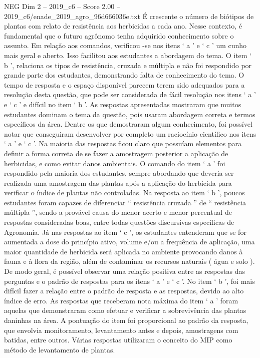 \begin{textsample}{NEG Dim 2 – 2019\_c6 – Score 2.00 – 2019\_c6/enade\_2019\_agro\_96d666036e.txt}
É crescente o número de biótipos de plantas com relato de resistência aos herbicidas a cada ano.
Nesse contexto, é fundamental que o futuro agrônomo tenha adquirido conhecimento sobre o assunto.
Em relação aos comandos, verificou -se nos itens ‘ a ’ e ‘ c ’ um cunho mais geral e aberto.
Isso facilitou aos estudantes a abordagem do tema.
O item ‘ b ’, relaciona os tipos de resistência, cruzada e múltipla e não foi respondido por grande parte dos estudantes, demonstrando falta de conhecimento do tema.
O tempo de resposta e o espaço disponível parecem terem sido adequados para a resolução desta questão, que pode ser considerada de fácil resolução nos itens ‘ a ’ e ‘ c ’ e difícil no item ‘ b ’.
As respostas apresentadas mostraram que muitos estudantes dominam o tema da questão, pois usaram abordagem correta e termos específicos da área.
Dentre os que demostraram algum conhecimento, foi possível notar que conseguiram desenvolver por completo um raciocínio científico nos itens ‘ a ’ e ‘ c ’.
Na maioria das respostas ficou claro que possuíam elementos para definir a forma correta de se fazer a amostragem posterior a aplicação de herbicidas, e como evitar danos ambientais.
O comando do item ‘ a ’ foi respondido pela maioria dos estudantes, sempre abordando que deveria ser realizada uma amostragem das plantas após a aplicação do herbicida para verificar o índice de plantas não controladas.
Na resposta ao item ‘ b ’, poucos estudantes foram capazes de diferenciar “ resistência cruzada ” de “ resistência múltipla ”, sendo a provável causa do menor acerto e menor percentual de respostas consideradas boas, entre todas questões discursivas específicas de Agronomia.
Já nas respostas ao item ‘ c ’, os estudantes entenderam que se for aumentada a dose do princípio ativo, volume e/ou a frequência de aplicação, uma maior quantidade de herbicida será aplicada no ambiente provocando danos à fauna e à flora da região, além de contaminar os recursos naturais ( água e solo ).
De modo geral, é possível observar uma relação positiva entre as respostas das perguntas e o padrão de respostas para os itens ‘ a ’ e ‘ c ’.
No item ‘ b ’, foi mais difícil fazer a relação entre o padrão de resposta e as respostas, devido ao alto índice de erro.
As respostas que receberam nota máxima do item ‘ a ’ foram aquelas que demonstraram como efetuar e verificar a sobrevivência das plantas daninhas na área.
A pontuação do item foi proporcional ao padrão da resposta, que envolvia monitoramento, levantamento antes e depois, amostragens com batidas, entre outros.
Várias respostas utilizaram o conceito do MIP como método de levantamento de plantas.

\end{textsample}
